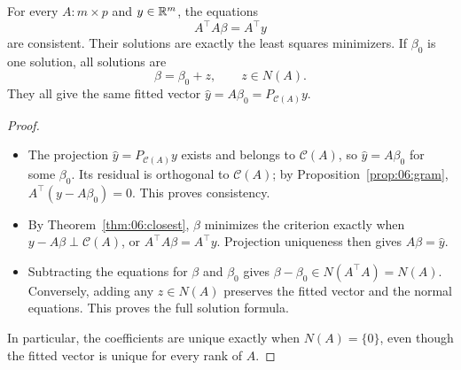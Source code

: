 \begin{theorem}\label{thm:06:normal}
For every \(A:m\times p\) and \(y\in\mathbb R^m\), the equations
\[
A^\top A\beta=A^\top y
\]
are consistent. Their solutions are exactly the least squares minimizers.
If \(\beta_0\) is one solution, all solutions are
\[
\beta=\beta_0+z,\qquad z\in N(A).
\]
They all give the same fitted vector \(\hat y=A\beta_0=P_{\mathcal C(A)}y\).
\end{theorem}
\begin{proof}
\begin{itemize}
\item The projection \(\hat y=P_{\mathcal C(A)}y\) exists and belongs
  to \(\mathcal C(A)\), so \(\hat y=A\beta_0\) for some \(\beta_0\).
  Its residual is orthogonal to \(\mathcal C(A)\); by
  Proposition~\ref{prop:06:gram},
  \(A^\top(y-A\beta_0)=0\). This proves consistency.
\item By Theorem~\ref{thm:06:closest}, \(\beta\) minimizes the criterion
  exactly when \(y-A\beta\perp\mathcal C(A)\), or
  \(A^\top A\beta=A^\top y\). Projection uniqueness then gives
  \(A\beta=\hat y\).
\item Subtracting the equations for \(\beta\) and \(\beta_0\) gives
  \(\beta-\beta_0\in N(A^\top A)=N(A)\).
  Conversely, adding any \(z\in N(A)\) preserves the fitted vector
  and the normal equations. This proves the full solution formula.
\end{itemize}
In particular, the coefficients are unique exactly when \(N(A)=\{0\}\),
even though the fitted vector is unique for every rank of \(A\).
\end{proof}

